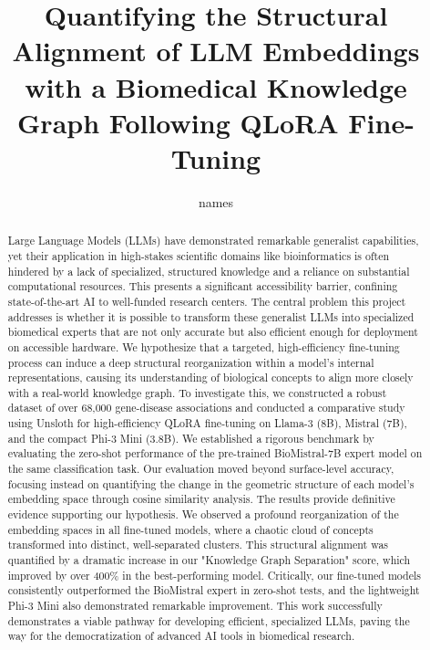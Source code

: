\documentclass{article}
\title{Quantifying the Structural Alignment of LLM Embeddings with a Biomedical Knowledge Graph Following QLoRA Fine-Tuning}
\author{names}
\date{}
\begin{document}
\maketitle
\begin{abstract}
    Large Language Models (LLMs) have demonstrated remarkable generalist capabilities, yet their application in high-stakes scientific domains like bioinformatics is often hindered by a lack of specialized, structured knowledge and a reliance on substantial computational resources. This presents a significant accessibility barrier, confining state-of-the-art AI to well-funded research centers. The central problem this project addresses is whether it is possible to transform these generalist LLMs into specialized biomedical experts that are not only accurate but also efficient enough for deployment on accessible hardware. We hypothesize that a targeted, high-efficiency fine-tuning process can induce a deep structural reorganization within a model's internal representations, causing its understanding of biological concepts to align more closely with a real-world knowledge graph. To investigate this, we constructed a robust dataset of over 68,000 gene-disease associations and conducted a comparative study using Unsloth for high-efficiency QLoRA fine-tuning on Llama-3 (8B), Mistral (7B), and the compact Phi-3 Mini (3.8B). We established a rigorous benchmark by evaluating the zero-shot performance of the pre-trained BioMistral-7B expert model on the same classification task. Our evaluation moved beyond surface-level accuracy, focusing instead on quantifying the change in the geometric structure of each model's embedding space through cosine similarity analysis. The results provide definitive evidence supporting our hypothesis. We observed a profound reorganization of the embedding spaces in all fine-tuned models, where a chaotic cloud of concepts transformed into distinct, well-separated clusters. This structural alignment was quantified by a dramatic increase in our "Knowledge Graph Separation" score, which improved by over 400\% in the best-performing model. Critically, our fine-tuned models consistently outperformed the BioMistral expert in zero-shot tests, and the lightweight Phi-3 Mini also demonstrated remarkable improvement. This work successfully demonstrates a viable pathway for developing efficient, specialized LLMs, paving the way for the democratization of advanced AI tools in biomedical research.
\end{abstract}
\end{document}
